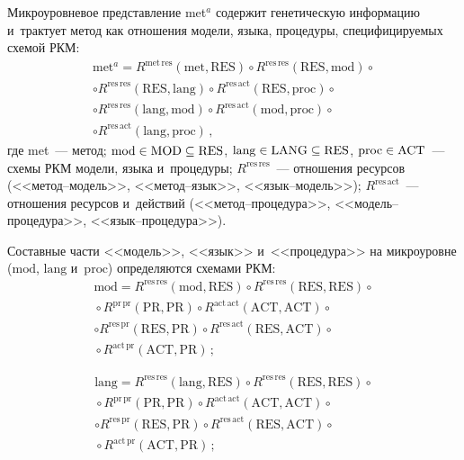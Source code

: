 \begin{multicols}{2}
  Микроуровневое представление met$^a$ содержит генетическую информацию и~трактует 
метод как отношения модели, языка, процедуры, специфицируемых схемой РКМ: 
  \begin{multline*}
  \mathrm{met}^a= R^{\mathrm{met\,res}}(\mathrm{met, RES})\circ R^{\mathrm{res\,res}} 
(\mathrm{RES, mod})\circ \\
\circ R^{\mathrm{res\,res}}(\mathrm{RES, lang})\circ  R^{\mathrm{res\,act}}
(\mathrm{RES,proc})\circ \\
\circ 
R^{\mathrm{res\,res}}(\mathrm{lang,mod})\circ 
R^{\mathrm{res\,act}}(\mathrm{mod,proc})\circ\\
\circ 
  R^{\mathrm{res\,act}}(\mathrm{lang,proc})\,,
  \end{multline*}
где met~--- метод; $\mathrm{mod}\hm\in \mathrm{MOD}\subseteq \mathrm{RES}$, 
$\mathrm{lang}\hm\in \mathrm{LANG}\hm\subseteq \mathrm{RES}$, $\mathrm{proc}\hm\in 
\mathrm{ACT}$~--- схемы РКМ модели, языка и~процедуры; $R^{\mathrm{res\,res}}$~--- 
отношения ресурсов (<<ме\-тод--мо\-дель>>, <<ме\-тод--язык>>, <<язык--мо\-дель>>); 
$R^{\mathrm{res\,act}}$~--- отношения ресурсов и~действий (<<ме\-тод--про\-це\-ду\-ра>>, 
<<мо\-дель--про\-це\-ду\-ра>>, <<язык--про\-це\-дура>>).

  Составные части <<модель>>, <<язык>> и~<<процедура>> на микроуровне 
($\mathrm{mod}$, $\mathrm{lang}$ и~$\mathrm{proc}$) определяются схемами РКМ:
  \begin{multline*}
  \mathrm{mod}= R^{\mathrm{res\,res}}(\mathrm{mod,RES}) \circ 
R^{\mathrm{res\,res}}(\mathrm{RES,RES})\circ {}\\
{}\circ R^{\mathrm{pr\,pr}}(\mathrm{PR,PR})\circ 
R^{\mathrm{act\,act}}(\mathrm{ACT, ACT})\circ\\
  \circ R^{\mathrm{res\,pr}}(\mathrm{RES,PR}) \circ R^{\mathrm{res\,act}}(\mathrm{RES, 
ACT})\circ{}\\
{}\circ R^{\mathrm{act\,pr}}(\mathrm{ACT,PR})\,;
  \end{multline*}
  
  \vspace*{-12pt}
  
  \noindent
  \begin{multline*}
\mathrm{lang} = R^{\mathrm{res\,res}}(\mathrm{lang,RES})\circ 
R^{\mathrm{res\,res}}(\mathrm{RES,RES}) \circ{}\\
{}\circ R^{\mathrm{pr\,pr}}(\mathrm{PR,PR}) \circ 
R^{\mathrm{act\,act}}(\mathrm{ACT,ACT})\circ\\
\circ R^{\mathrm{res\,pr}}(\mathrm{RES,PR})\circ R^{\mathrm{res\,act}}(\mathrm{RES, 
ACT})\circ{}\\
{}\circ R^{\mathrm{act\,pr}}(\mathrm{ACT,PR})\,;
\end{multline*}


\end{multicols}
